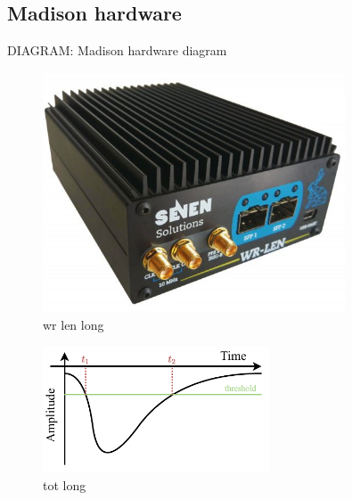 \subsection{Madison hardware} %
\label{sec:daq_hard_madison} %

DIAGRAM: Madison hardware diagram

\begin{figure} %
    \includegraphics[width=0.8\textwidth]{diagrams/5-daq/wr_len.jpg}
    \caption[wr len short]
    {wr len long}
    \label{fig:wr_len}
\end{figure}

\begin{figure} %
    \includegraphics[width=0.6\textwidth]{diagrams/5-daq/tot.pdf}
    \caption[tot short]
    {tot long}
    \label{fig:tot}
\end{figure}

